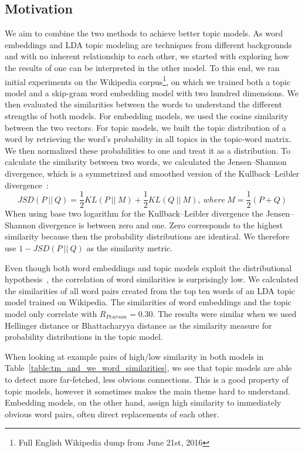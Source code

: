 \documentclass[
        a4paper,
        titlepage,
        twoside,
        parskip,
        numbers=noenddot
        ]{scrbook}
\theoremstyle{break}
\begin{document}
\subsection{Motivation}
\label{sec:welda_motivation}
We aim to combine the two methods to achieve better topic models.
As word embeddings and LDA topic modeling are techniques from different backgrounds and with no inherent relationship to each other, we started with exploring how the results of one can be interpreted in the other model.
To this end, we ran initial experiments on the Wikipedia corpus\footnote{Full English Wikipedia dump from June 21st, 2016}, on which we trained both a topic model and a skip-gram word embedding model with two hundred dimensions.
We then evaluated the similarities between the words to understand the different strengths of both models.
For embedding models, we used the cosine similarity between the two vectors.
For topic models, we built the topic distribution of a word by retrieving the word's probability in all topics in the topic-word matrix.
We then normalized these probabilities to one and treat it as a distribution.
To calculate the similarity between two words, we calculated the Jensen--Shannon divergence, which is a symmetrized and smoothed version of the Kullback--Leibler divergence~\cite{Kullback1951}:
\begin{equation*}
  JSD(P~||~Q) = \frac{1}{2} KL(P~||~M) + \frac{1}{2} KL(Q~||~M),~where~M = \frac{1}{2} ( P + Q)
\end{equation*}
When using base two logarithm for the Kullback--Leibler divergence the Jensen--Shannon divergence is between zero and one.
Zero corresponds to the highest similarity because then the probability distributions are identical.
We therefore use $1 - JSD(P~||~Q)$ as the similarity metric.

Even though both word embeddings and topic models exploit the distributional hypothesis~\cite{Firth1957}, the correlation of word similarities is surprisingly low.
We calculated the similarities of all word pairs created from the top ten words of an LDA topic model trained on Wikipedia.
The similarities of word embeddings and the topic model only correlate with $R_{Pearson} = 0.30$.
The results were similar when we used Hellinger distance or Bhattacharyya distance as the similarity measure for probability distributions in the topic model.

When looking at example pairs of high/low similarity in both models in Table~\ref{table:tm_and_we_word_similarities}, we see that topic models are able to detect more far-fetched, less obvious connections.
This is a good property of topic models, however it sometimes makes the main theme hard to understand.
Embedding models, on the other hand, assign high similarity to immediately obvious word pairs, often direct replacements of each other.
\end{document}
